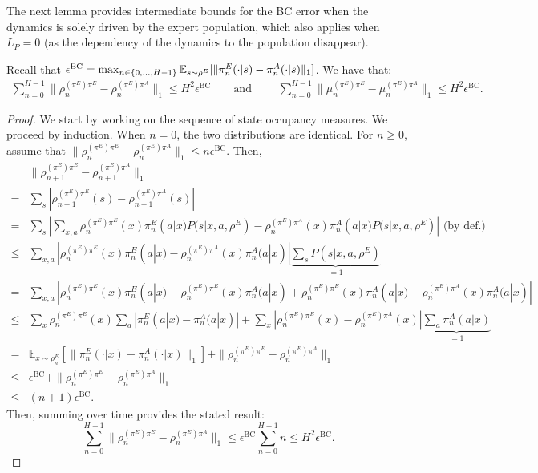 \documentclass{article}
\begin{document}
The next lemma provides intermediate bounds for the BC error when the dynamics is solely driven by the expert population, which also applies when $L_P=0$ (as the dependency of the dynamics to the population disappear).

\begin{lemma}
\label{lem:bc-error-flow}
Recall that $\epsilon^\mathrm{BC} = \max_{n\in\{0,\dots,H-1\}} \mathbb{E}_{s\sim\rho^E}[\|\pi_n^E(\cdot|s) - \pi_n^A(\cdot|s)\|_1]$. We have that:
\begin{align}
    \sum_{n=0}^{H-1}\|\rho_n^{(\pi^E)\pi^E} - \rho_n^{(\pi^E)\pi^A}\|_1 \le H^2 \epsilon^\mathrm{BC} \qquad \text{and } \qquad \sum_{n=0}^{H-1}\|\mu_n^{(\pi^E)\pi^E} - \mu_n^{(\pi^E)\pi^A}\|_1 \le H^2 \epsilon^\mathrm{BC}.
\end{align}
\end{lemma}
\begin{proof}
We start by working on the sequence of state occupancy measures. We proceed by induction. When $n=0$, the two distributions are identical. For $n \ge 0$, assume that $\|\rho_{n}^{(\pi^E)\pi^E} - \rho_{n}^{(\pi^E)\pi^A}\|_1 \le n \epsilon^\mathrm{BC}$. Then, 
\begin{align}
    &\|\rho_{n+1}^{(\pi^E)\pi^E} - \rho_{n+1}^{(\pi^E)\pi^A}\|_1
    \\
    = &\sum_{s}|\rho_{n+1}^{(\pi^E)\pi^E}(s) - \rho_{n+1}^{(\pi^E)\pi^A}(s)|
    \\
    = &\sum_{s}|\sum_{x,a} \rho_{n}^{(\pi^E)\pi^E}(x)\pi_n^E(a|x)P(s|x,a,\rho^E) - \rho_{n}^{(\pi^E)\pi^A}(x)\pi_n^A(a|x)P(s|x,a,\rho^E)| \text{    (by def.)}
    \\
    \le  &\sum_{x,a}| \rho_{n}^{(\pi^E)\pi^E}(x)\pi_n^E(a|x) - \rho_{n}^{(\pi^E)\pi^A}(x)\pi_n^A(a|x)| \underbrace{\sum_{s}P(s|x,a,\rho^E)}_{=1}
    \\
    =&\sum_{x,a}|\rho_{n}^{(\pi^E)\pi^E}(x)\pi_n^E(a|x) - \rho_{n}^{(\pi^E)\pi^E}(x)\pi_n^A(a|x) + \rho_{n}^{(\pi^E)\pi^E}(x)\pi_n^A(a|x) - \rho_{n}^{(\pi^E)\pi^A}(x)\pi_n^A(a|x)| 
    \\
    \leq &\sum_x \rho_{n}^{(\pi^E)\pi^E}(x) \sum_a |\pi_n^E(a|x) -\pi_n^A(a|x)|
    +\sum_x |\rho_{n}^{(\pi^E)\pi^E}(x) - \rho_{n}^{(\pi^E)\pi^A}(x)| \underbrace{\sum_a \pi_n^A(a|x)}_{=1}
    \\
    = &\mathbb{E}_{x \sim \rho^{E}_n}\left[\|\pi^E_n(\cdot|x) - \pi^A_n(\cdot|x)\|_1\right] + \|\rho_n^{(\pi^E)\pi^E} - \rho_n^{(\pi^E)\pi^A}\|_1 
    \\
    \le &\epsilon^\mathrm{BC} + \|\rho_n^{(\pi^E)\pi^E} - \rho_n^{(\pi^E)\pi^A}\|_1
    \\
    \le &(n+1)\epsilon^\mathrm{BC}.
\end{align}
Then, summing over time provides the stated result:
\begin{equation}
    \sum_{n=0}^{H-1} \|\rho_n^{(\pi^E)\pi^E} - \rho_n^{(\pi^E)\pi^A}\|_1 \leq \epsilon^\mathrm{BC} \sum_{n=0}^{H-1} n \leq H^2 \epsilon^\mathrm{BC}.
\end{equation}


\end{proof}
\end{document}
